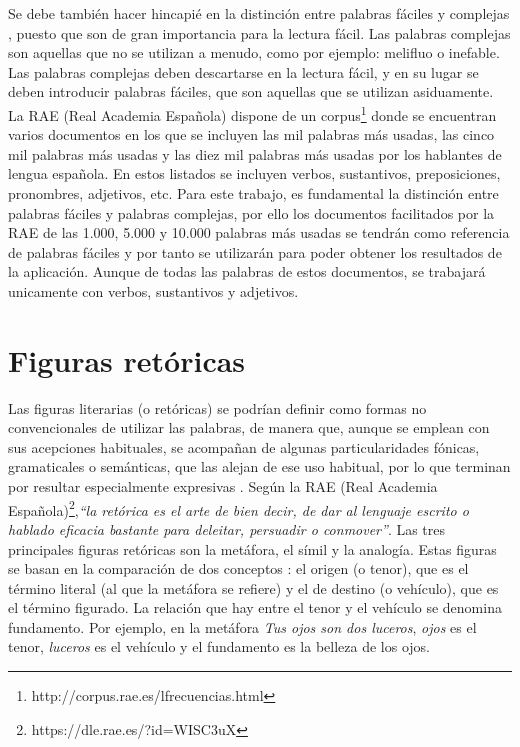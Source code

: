 Se debe también hacer hincapié en la distinción entre palabras fáciles y complejas \citep{GarciaMunoz2012LecturaFacil}, puesto que son de gran importancia para la lectura fácil. 
Las palabras complejas son aquellas que no se utilizan a menudo, como por ejemplo: melifluo o inefable. Las palabras complejas deben descartarse en la lectura fácil, y en su lugar se deben introducir palabras fáciles, que son aquellas que se utilizan asiduamente. La RAE (Real Academia Española) dispone de un corpus\footnote{http://corpus.rae.es/lfrecuencias.html} donde se encuentran varios documentos en los que se incluyen las mil palabras más usadas, las cinco mil palabras más usadas y las diez mil palabras más usadas por los hablantes de lengua española. En estos listados se incluyen verbos, sustantivos, preposiciones, pronombres, adjetivos, etc.
Para este trabajo, es fundamental la distinción entre palabras fáciles y palabras complejas, por ello los documentos facilitados por la RAE de las 1.000, 5.000 y 10.000 palabras más usadas se tendrán como referencia de palabras fáciles y por tanto se utilizarán para poder obtener los resultados de la aplicación. Aunque de todas las palabras de estos documentos, se trabajará unicamente con verbos, sustantivos y adjetivos.
 

 



\section{Figuras retóricas}
\label{cap:sec:figurasretoricas}

Las figuras literarias (o retóricas) se podrían definir como formas no convencionales de utilizar las palabras, de manera que, aunque se emplean con sus acepciones habituales, se acompañan de algunas particularidades fónicas, gramaticales o semánticas, que las alejan de ese uso habitual, por lo que terminan por resultar especialmente expresivas \citep{GalianaYCasas1994}. 
Según la RAE (Real Academia Española)\footnote{https://dle.rae.es/?id=WISC3uX},\textit{``la retórica es el arte de bien decir, de dar al lenguaje escrito o hablado eficacia bastante para deleitar, persuadir o conmover''}.
Las tres principales figuras retóricas son la metáfora, el símil y la analogía. Estas figuras se basan en la comparación de dos conceptos  \citep{GalianaYCasas1994}: el origen (o tenor), que es el término literal (al que la metáfora se refiere) y el de destino (o vehículo), que es el término figurado. La relación que hay entre el tenor y el vehículo se denomina fundamento. Por ejemplo, en la metáfora \textit{Tus ojos son dos luceros}, \textit{ojos} es el tenor, \textit{luceros} es el vehículo y el fundamento es la belleza de los ojos.


